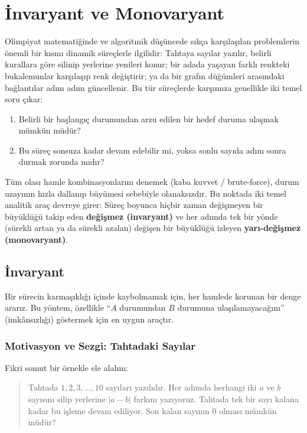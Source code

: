 \chapter[İnvaryant ve Monovaryant · \textit{İleri}]{İnvaryant ve Monovaryant}

Olimpiyat matematiğinde ve algoritmik düşüncede sıkça karşılaşılan problemlerin önemli bir kısmı dinamik süreçlerle ilgilidir: Tahtaya sayılar yazılır, belirli kurallara göre silinip yerlerine yenileri konur; bir adada yaşayan farklı renkteki bukalemunlar karşılaşıp renk değiştirir; ya da bir grafın düğümleri arasındaki bağlantılar adım adım güncellenir. Bu tür süreçlerde karşımıza genellikle iki temel soru çıkar:
\begin{enumerate}
    \item Belirli bir başlangıç durumundan arzu edilen bir hedef duruma ulaşmak mümkün müdür?
    \item Bu süreç sonsuza kadar devam edebilir mi, yoksa sonlu sayıda adım sonra durmak zorunda mıdır?
\end{enumerate}

Tüm olası hamle kombinasyonlarını denemek (kaba kuvvet / brute-force), durum uzayının hızla dallanıp büyümesi sebebiyle olanaksızdır. Bu noktada iki temel analitik araç devreye girer: Süreç boyunca hiçbir zaman değişmeyen bir büyüklüğü takip eden \textbf{değişmez (invaryant)} ve her adımda tek bir yönde (sürekli artan ya da sürekli azalan) değişen bir büyüklüğü izleyen \textbf{yarı-değişmez (monovaryant)}.

\section{İnvaryant}

Bir sürecin karmaşıklığı içinde kaybolmamak için, her hamlede korunan bir denge ararız. Bu yöntem, özellikle ``$A$ durumundan $B$ durumuna ulaşılamayacağını'' (imkânsızlığı) göstermek için en uygun araçtır.

\subsection{Motivasyon ve Sezgi: Tahtadaki Sayılar}

Fikri somut bir örnekle ele alalım:

\begin{quote}
Tahtada $1, 2, 3, \dots, 10$ sayıları yazılıdır. Her adımda herhangi iki $a$ ve $b$ sayısını silip yerlerine $|a - b|$ farkını yazıyoruz. Tahtada tek bir sayı kalana kadar bu işleme devam ediliyor. Son kalan sayının $0$ olması mümkün müdür?
\end{quote}

